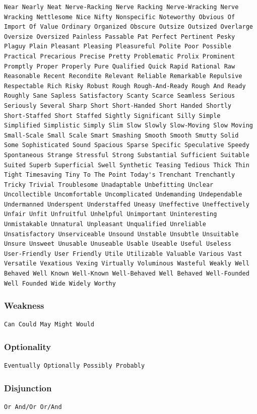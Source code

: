 \documentclass[12pt]{report}
\begin{document}
\begin{lstlisting}
Near Nearly Neat Nerve-Racking Nerve Racking Nerve-Wracking Nerve
Wracking Nettlesome Nice Nifty Nonspecific Noteworthy Obvious Of
Import Of Value Ordinary Organized Obscure Outsize Outsized Overlarge
Oversize Oversized Painless Passable Pat Perfect Pertinent Pesky
Plaguy Plain Pleasant Pleasing Pleasureful Polite Poor Possible
Practical Precarious Precise Pretty Problematic Prolix Prominent
Promptly Proper Properly Pure Qualified Quick Rapid Rational Raw
Reasonable Recent Recondite Relevant Reliable Remarkable Repulsive
Respectable Rich Risky Robust Rough Rough-And-Ready Rough And Ready
Roughly Sane Sapless Satisfactory Scanty Scarce Seamless Serious
Seriously Several Sharp Short Short-Handed Short Handed Shortly
Short-Staffed Short Staffed Sightly Significant Silly Simple
Simplified Simplistic Simply Slim Slow Slowly Slow-Moving Slow Moving
Small-Scale Small Scale Smart Smashing Smooth Smooth Smutty Solid
Some Sophisticated Sound Spacious Sparse Specific Speculative Speedy
Spontaneous Strange Stressful Strong Substantial Sufficient Suitable
Suited Superb Superficial Swell Synthetic Teasing Tedious Thick Thin
Tight Timesaving Tiny To The Point Today's Trenchant Trenchantly
Tricky Trivial Troublesome Unadaptable Unbefitting Unclear
Uncollectible Uncomfortable Uncomplicated Undemanding Undependable
Undermanned Underspent Understaffed Uneasy Uneffective Uneffectively
Unfair Unfit Unfruitful Unhelpful Unimportant Uninteresting
Unmistakable Unnatural Unpleasant Unqualified Unreliable
Unsatisfactory Unserviceable Unsound Unstable Unsubtle Unsuitable
Unsure Unsweet Unusable Unuseable Usable Useable Useful Useless
User-Friendly User Friendly Utile Utilizable Valuable Various Vast
Versatile Vexatious Vexing Virtually Voluminous Wasteful Weakly Well
Behaved Well Known Well-Known Well-Behaved Well Behaved Well-Founded
Well Founded Wide Widely Worthy
\end{lstlisting}


\subsubsection{Weakness}
\begin{lstlisting}
Can Could May Might Would
\end{lstlisting}


\subsubsection{Optionality}
\begin{lstlisting}
Eventually Optionally Possibly Probably
\end{lstlisting}


\subsubsection{Disjunction}
\begin{lstlisting}
Or And/Or Or/And
\end{lstlisting}
\end{document}
